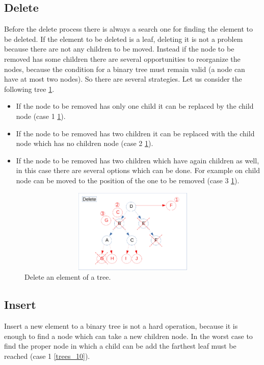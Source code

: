 \subsection{Delete}
Before the delete process there is always a search one for finding the element to be deleted. If the element to be deleted is a leaf, deleting it is not a problem because there are not any children to be moved. Instead if the node to be removed has some children there are several opportunities to reorganize the nodes, because the condition for a binary tree must remain valid (a node can have at most two nodes). So there are several strategies. Let us consider the following tree \ref{trees_9}. 
\begin{itemize}
\item If the node to be removed has only one child it can be replaced by the child node (case 1 \ref{trees_9}).
\item If the node to be removed has two children it can be replaced with the child node which has no children node (case 2 \ref{trees_9}).
\item If the node to be removed has two children which have again children as well, in this case there are several options which can be done. For example on child node can be moved to the position of the one to be removed (case 3 \ref{trees_9}).
\end{itemize} 

\begin{figure}[hb]
	\includegraphics[width=12cm,height=4cm]{chapters/trees/images/trees_9.pdf}
	\caption[]{Delete an element of a tree.}
	\label{trees_9}
\end{figure}

\subsection{Insert}
Insert a new element to a binary tree is not a hard operation, because it is enough to find a node which can take a new children node. In the worst case to find the proper node in which a child can be add the farthest leaf must be reached (case 1 \ref{trees_10}).

